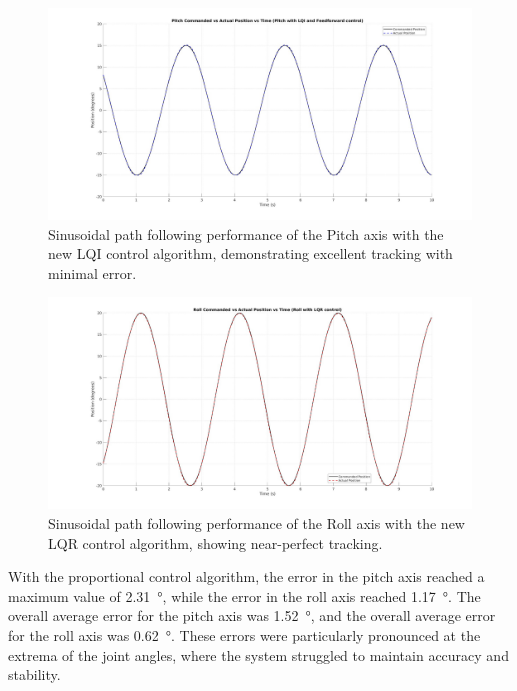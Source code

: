 \begin{figure}[h!]
    \centering
    \includegraphics[width=1.00\linewidth]{figures/pitch_lqi_sin.jpg}
    \caption{Sinusoidal path following performance of the Pitch axis with the new LQI control algorithm, demonstrating excellent tracking with minimal error.}
    \label{fig:pitch_lqi_sin}
\end{figure}

\begin{figure}[h!]
    \centering
    \includegraphics[width=1.00\linewidth]{figures/roll_lqr_sin.jpg}
    \caption{Sinusoidal path following performance of the Roll axis with the new LQR control algorithm, showing near-perfect tracking.}
    \label{fig:roll_lqr_sin}
\end{figure}

With the proportional control algorithm, the error in the pitch axis reached a maximum value of \SI{2.31}{\degree}, while the error in the roll axis reached \SI{1.17}{\degree}. The overall average error for the pitch axis was \SI{1.52}{\degree}, and the overall average error for the roll axis was \SI{0.62}{\degree}. These errors were particularly pronounced at the extrema of the joint angles, where the system struggled to maintain accuracy and stability.

